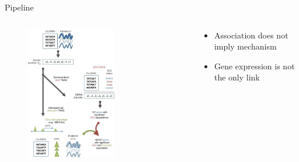 \documentclass[aspectratio=169,12pt]{beamer}
\begin{document}
\begin{frame}{Pipeline}

	\begin{columns}
		\begin{column}{0.6\textwidth}
			\begin{figure}
				\includegraphics[width=0.63\textwidth]{gusev2018/1-TWAS_schematic_cropped}
			\end{figure}
		\end{column}

		\begin{column}{0.4\textwidth}
			\begin{itemize}
				\item Association does not imply mechanism
				\item Gene expression is not the only link
			\end{itemize}
		\end{column}
	\end{columns}


\end{frame}
\end{document}
